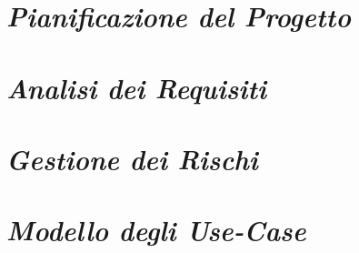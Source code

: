 \documentclass{article}
\begin{document}
\newpage
\section{\itshape{Pianificazione del Progetto}}


\newpage
\section{\itshape{Analisi dei Requisiti}}


\newpage
\section{\itshape{Gestione dei Rischi}}



\newpage
\section{\itshape{Modello degli Use-Case}}

\end{document}
